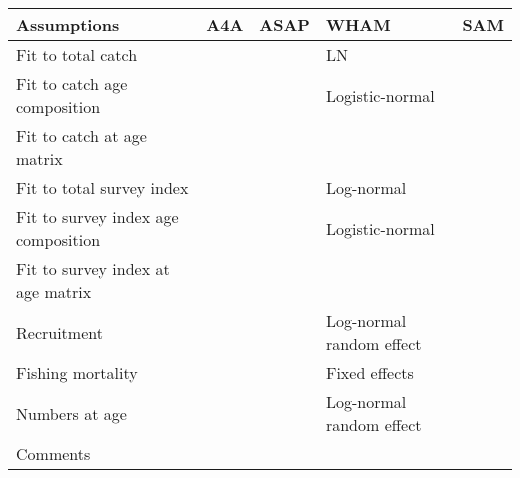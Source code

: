 
\begin{tabular}{lllll}
\toprule
Assumptions & A4A & ASAP & WHAM & SAM\\
\midrule
Fit to total catch & & & LN & \\
Fit to catch age composition & & & Logistic-normal & \\
Fit to catch at age matrix & & & & \\
Fit to total survey index & & & Log-normal & \\
Fit to survey index age composition & & & Logistic-normal & \\
Fit to survey index at age matrix & & & & \\
Recruitment & & & Log-normal random effect& \\
Fishing mortality & & & Fixed effects & \\
Numbers at age & & & Log-normal random effect & \\
Comments & & & & \\
\bottomrule
\end{tabular}
